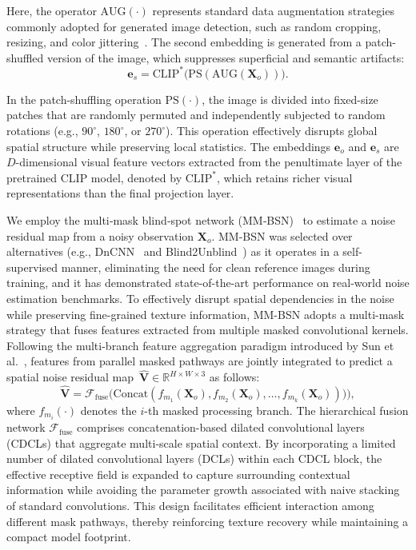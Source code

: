 \documentclass[letterpaper,twocolumn,10pt]{article}
\newcommand{\subhead}[1]{\vspace{1pt}\noindent{\textbf{#1.}}}
\newcommand{\bm}[1]{\mathbf{#1}} %
\begin{document}
Here, the operator $\mathrm{AUG}(\cdot)$ represents standard data augmentation strategies commonly adopted for generated image detection, such as random cropping, resizing, and color jittering~\cite{Wang2024cnngenerated}.
The second embedding is generated from a patch-shuffled version of the image, which suppresses superficial and semantic artifacts:
\begin{equation}
	\bm{e}_s = \mathrm{CLIP}^*\bigl(\mathrm{PS}(\mathrm{AUG}(\bm{X}_o))\bigr).
\end{equation}

In the patch-shuffling operation $\mathrm{PS}(\cdot)$, the image is divided into fixed-size patches that are randomly permuted and independently subjected to random rotations (e.g., $90^\circ$, $180^\circ$, or $270^\circ$). This operation effectively disrupts global spatial structure while preserving local statistics. The embeddings $\bm{e}_o$ and $\bm{e}_s$ are $D$-dimensional visual feature vectors extracted from the penultimate layer of the pretrained CLIP model, denoted by $\mathrm{CLIP}^*$, which retains richer visual representations than the final projection layer. 

\subhead{Content‑agnostic residual extraction}
We employ the multi‑mask blind‑spot network (MM‑BSN)~\cite{Zhang2023mmbsn} to estimate a noise residual map from a noisy observation $\bm{X}_o$. MM-BSN was selected over alternatives (e.g., DnCNN~\cite{zhang2017beyond} and  Blind2Unblind~\cite{Wang2022Blind2Unblind}) as it operates in a self-supervised manner, eliminating the need for clean reference images during training, and it has demonstrated state-of-the-art performance on real-world noise estimation benchmarks. To effectively disrupt spatial dependencies in the noise while preserving fine-grained texture information, MM-BSN adopts a multi-mask strategy that fuses features extracted from multiple masked convolutional kernels. Following the multi-branch feature aggregation paradigm introduced by Sun et al.~\cite{Sun2019HRNet}, features from parallel masked pathways are jointly integrated to predict a spatial noise residual map~$\hat{\bm{V}}\in \mathbb{R}^{H \times W \times 3}$ as follows:
\begin{equation}
\hat{\bm{V}} = \mathcal{F}_{\mathrm{fuse}}\bigl(\mathrm{Concat}(f_{m_1}(\bm{X}_o), f_{m_2}(\bm{X}_o), \dots, f_{m_k}(\bm{X}_o)))\bigr) ,
\end{equation}
where $f_{m_i}(\cdot)$ denotes the $i$-th masked processing branch. The hierarchical fusion network $\mathcal{F}_{\text{fuse}}$ comprises concatenation-based dilated convolutional layers (CDCLs) that aggregate multi-scale spatial context. By incorporating a limited number of dilated convolutional layers (DCLs) within each CDCL block, the effective receptive field is expanded to capture surrounding contextual information while avoiding the parameter growth associated with naive stacking of standard convolutions. This design facilitates efficient interaction among different mask pathways, thereby reinforcing texture recovery while maintaining a compact model footprint.
\end{document}
